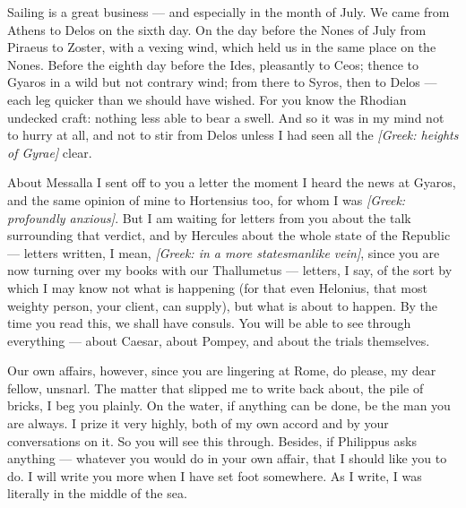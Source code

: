 

 Sailing is a great business --- and especially in the month of July. We came from Athens to Delos on the sixth day. On the day before the Nones of July from Piraeus to Zoster, with a vexing wind, which held us in the same place on the Nones. Before the eighth day before the Ides, pleasantly to Ceos; thence to Gyaros in a wild but not contrary wind; from there to Syros, then to Delos --- each leg quicker than we should have wished. For you know the Rhodian undecked craft: nothing less able to bear a swell. And so it was in my mind not to hurry at all, and not to stir from Delos unless I had seen all the \textit{[Greek: heights of Gyrae]} clear.

 About Messalla I sent off to you a letter the moment I heard the news at Gyaros, and the same opinion of mine to Hortensius too, for whom I was \textit{[Greek: profoundly anxious]}. But I am waiting for letters from you about the talk surrounding that verdict, and by Hercules about the whole state of the Republic --- letters written, I mean, \textit{[Greek: in a more statesmanlike vein]}, since you are now turning over my books with our Thallumetus --- letters, I say, of the sort by which I may know not what is happening (for that even Helonius, that most weighty person, your client, can supply), but what is about to happen. By the time you read this, we shall have consuls. You will be able to see through everything --- about Caesar, about Pompey, and about the trials themselves.

 Our own affairs, however, since you are lingering at Rome, do please, my dear fellow, unsnarl. The matter that slipped me to write back about, the pile of bricks, I beg you plainly. On the water, if anything can be done, be the man you are always. I prize it very highly, both of my own accord and by your conversations on it. So you will see this through. Besides, if Philippus asks anything --- whatever you would do in your own affair, that I should like you to do. I will write you more when I have set foot somewhere. As I write, I was literally in the middle of the sea.
